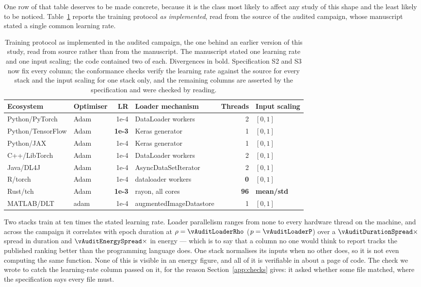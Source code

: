 One row of that table deserves to be made concrete, because it is the class most
likely to affect any study of this shape and the least likely to be noticed.
Table~\ref{tab:protocol} reports the training protocol \emph{as implemented},
read from the source of the audited campaign, whose manuscript stated a single
common learning rate.

\begin{table}[t]
\centering
\caption{Training protocol as implemented in the audited campaign, the one
behind an earlier version of this study, read from source rather than from the
manuscript. The manuscript stated one learning rate and one input scaling; the
code contained two of each. Divergences in bold. Specification S2 and S3 now fix
every column; the conformance checks verify the learning rate against the
source for every stack and the input scaling for one stack only, and the
remaining columns are asserted by the specification and were checked by
reading.}
\label{tab:protocol}
\small
\begin{tabularx}{\linewidth}{@{}llr>{\raggedright\arraybackslash}Xrl@{}}
\toprule
\textbf{Ecosystem} & \textbf{Optimiser} & \textbf{LR} & \textbf{Loader mechanism} & \textbf{Threads} & \textbf{Input scaling} \\
\midrule
Python/PyTorch    & Adam & 1e-4 & DataLoader workers & 2 & $[0,1]$ \\
Python/TensorFlow & Adam & \textbf{1e-3} & Keras generator & 1 & $[0,1]$ \\
Python/JAX        & Adam & 1e-4 & Keras generator & 1 & $[0,1]$ \\
C++/LibTorch      & Adam & 1e-4 & DataLoader workers & 2 & $[0,1]$ \\
Java/DL4J         & Adam & 1e-4 & Async\-DataSet\-Iterator & 2 & $[0,1]$ \\
R/torch           & Adam & 1e-4 & dataloader workers & \textbf{0} & $[0,1]$ \\
Rust/tch          & Adam & \textbf{1e-3} & rayon, all cores & \textbf{96} & \textbf{mean/std} \\
MATLAB/DLT        & adam & 1e-4 & augmented\-Image\-Datastore & 1 & $[0,1]$ \\
\bottomrule
\end{tabularx}
\end{table}

Two stacks train at ten times the stated learning rate. Loader parallelism
ranges from none to every hardware thread on the machine, and across the
campaign it correlates with epoch duration at $\rho = \vAuditLoaderRho$
($p = \vAuditLoaderP$) over a \(\vAuditDurationSpread\times\) spread in duration
and \(\vAuditEnergySpread\times\) in energy --- which is to say that a column no
one would think to report tracks the published ranking better than the
programming language does. One
stack normalises its inputs when no other does, so it is not even computing the
same function. None of this is visible in an energy figure, and all of it is
verifiable in about a page of code. The check we wrote to catch the learning-rate
column passed on it, for the reason Section~\ref{app:checks} gives: it asked
whether some file matched, where the specification says every file must.

